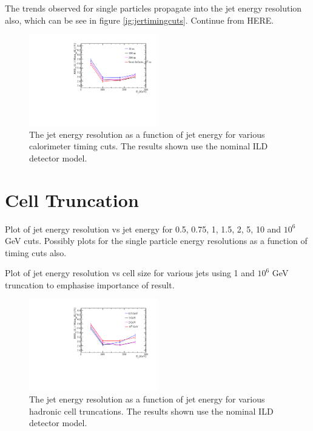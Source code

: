 The trends observed for single particles propagate into the jet energy resolution also, which can be see in figure \ref{ig:jertimingcuts}.  Continue from HERE.


\begin{figure}
\includegraphics[width=0.5\textwidth]{EnergyEstimators/Plots/TimingCuts/JER_vs_JetEnergy_TimingCutStudies.pdf}
\caption[The jet energy resolution as a function of jet energy for various calorimeter timing cuts.  The results shown use the nominal ILD detector model.]{The jet energy resolution as a function of jet energy for various calorimeter timing cuts.  The results shown use the nominal ILD detector model.}
\label{fig:jertimingcuts}
\end{figure}


\section{Cell Truncation}

Plot of jet energy resolution vs jet energy for 0.5, 0.75, 1, 1.5, 2, 5, 10 and $10^{6}$ GeV cuts.  Possibly plots for the single particle energy resolutions as a function of timing cuts also.

Plot of jet energy resolution vs cell size for various jets using 1 and $10^{6}$ GeV truncation to emphasise importance of result.

\begin{figure}
\includegraphics[width=0.5\textwidth]{EnergyEstimators/Plots/CellTruncation/JER_vs_JetEnergy_HCalCellTruncation.pdf}
\caption[The jet energy resolution as a function of jet energy for various hadronic cell truncations.  The results shown use the nominal ILD detector model.]{The jet energy resolution as a function of jet energy for various hadronic cell truncations.  The results shown use the nominal ILD detector model.}
\label{fig:jertimingcuts}
\end{figure}

